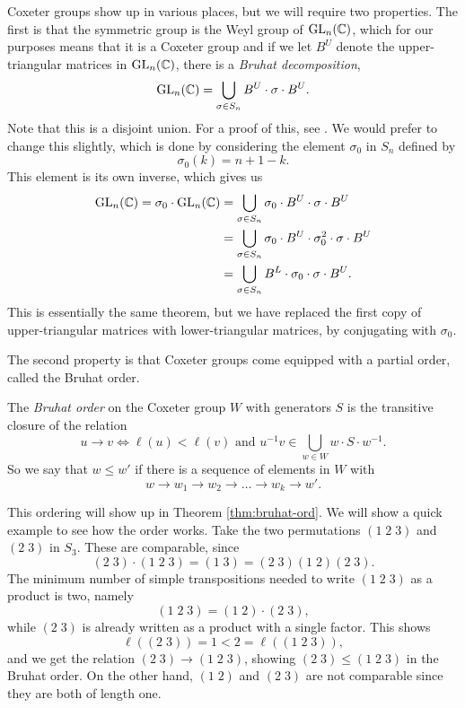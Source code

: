 Coxeter groups show up in various places, but we will require two
properties. The first is that the symmetric group is the Weyl group of
$\operatorname{GL}_n(\mathbb{C})$, which for our purposes means that it is a Coxeter group
and if we let $B^U$ denote the upper-triangular matrices in
$\operatorname{GL}_n(\mathbb{C})$, there is a \textit{Bruhat decomposition},
\[ \operatorname{GL}_n(\mathbb{C}) = \bigcup_{\sigma \in S_n} B^U \cdot \sigma \cdot B^U. \]
Note that this is a disjoint union. For a proof of this, see
\cite[Theorem 4.3]{hiller}. We
would prefer to change this slightly, which is done by considering the
element $\sigma_0$ in $S_n$ defined by
\[ \sigma_0(k) = n+1-k. \]
This element is its own inverse, which gives us
\begin{align*}
  \operatorname{GL}_n(\mathbb{C}) = \sigma_0 \cdot \operatorname{GL}_n(\mathbb{C}) &= \bigcup_{\sigma\in S_n}
                                         \sigma_0\cdot B^U \cdot
                                         \sigma\cdot B^U \\
                                       &= \bigcup_{\sigma\in S_n}
                                         \sigma_0\cdot B^U \cdot
                                         \sigma_0^2\cdot \sigma \cdot
                                         B^U \\
                                       &= \bigcup_{\sigma\in S_n}
                                         B^L\cdot \sigma_0\cdot
                                         \sigma\cdot B^U.
\end{align*}
This is essentially the same theorem, but we have replaced the first
copy of upper-triangular matrices with lower-triangular matrices, by
conjugating with $\sigma_0$.

The second property is that Coxeter groups come equipped with a
partial order, called the Bruhat order.
\begin{definition}
  \label{def:bruhat-def}
  The \textit{Bruhat order} on the Coxeter group $W$ with generators
  $S$ is the transitive closure of the relation
  \[ u \to v \iff \ell(u) < \ell(v) \text{ and } u^{-1}v \in
  \bigcup_{w\in W} w
  \cdot S \cdot w^{-1}. \]
  So we say that $w \leq w'$ if there is a sequence of elements in $W$
  with
  \[ w \to w_1 \to w_2 \to \dots \to w_k \to w'. \]
\end{definition}

This ordering will show up in Theorem \ref{thm:bruhat-ord}. We will
show a quick example to see how the order works. Take the two
permutations $(1\;2\;3)$ and $(2\;3)$ in $S_3$. These are comparable,
since
\[ (2\;3) \cdot (1\;2 \;3) = (1\;3) = (2\;3) (1\; 2) (2\; 3). \]
The minimum number of simple transpositions needed to write $(1\;2\;3)$
as a product is two, namely
\[ (1\;2\;3) = (1\;2) \cdot (2\;3), \]
while $(2\;3)$ is already written as a product with a single
factor. This shows
\[ \ell((2\;3)) = 1 < 2 = \ell((1\;2\;3)), \]
and we get the relation $(2\;3) \to (1\;2\;3)$, showing $(2\;3) \leq
(1\;2\;3)$ in the Bruhat order. On the other
hand, $(1\;2)$ and $(2\;3)$ are not comparable since they are both of
length one.

